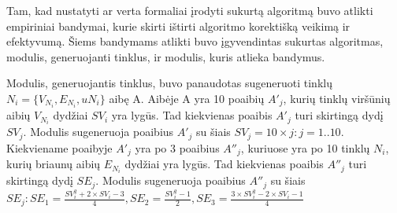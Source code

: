 Tam, kad nustatyti ar verta formaliai įrodyti sukurtą algoritmą buvo atlikti empiriniai bandymai, kurie skirti ištirti algoritmo korektišką veikimą ir efektyvumą. Šiems bandymams atlikti buvo įgyvendintas sukurtas algoritmas, modulis, generuojanti tinklus, ir modulis, kuris atlieka bandymus. 

Modulis, generuojantis tinklus, buvo panaudotas sugeneruoti tinklų $N_i = \{V_{N_i}, E_{N_i}, u{N_i}\}$ aibę A. Aibėje A yra 10 poaibių $A'_j$, kurių tinklų viršūnių aibių $V_{N_i}$ dydžiai $SV_i$ yra lygūs. Tad kiekvienas poaibis  $A'_j$ turi skirtingą dydį  $SV_j$. Modulis sugeneruoja poaibius $A'_j$ su šiais $SV_j = 10 \times j : j = 1 .. 10$. Kiekviename poaibyje $A'_j$ yra po 3 poaibius $A''_j$, kuriuose yra po 10 tinklų $N_i$, kurių briaunų aibių $E_{N_i}$ dydžiai yra lygūs. Tad kiekvienas poaibis  $A''_j$ turi skirtingą dydį  $SE_j$. Modulis sugeneruoja poaibius $A''_j$ su šiais  $SE_j : SE_1 = \frac{SV_i^2 + 2 \times SV_i - 3}{4}, SE_2 = \frac{SV_i^2 - 1}{2}, SE_3 = \frac{3 \times SV_i^2 - 2 \times SV_i - 1}{4}$
